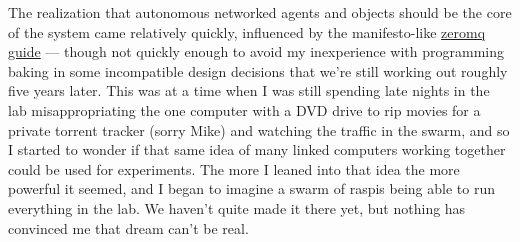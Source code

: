 The realization that autonomous networked agents and objects should be the core of the system came relatively quickly, influenced by the manifesto-like \href{https://zguide.zeromq.org/}{zeromq guide} --- though not quickly enough to avoid my inexperience with programming baking in some incompatible design decisions that we're still working out roughly five years later. This was at a time when I was still spending late nights in the lab misappropriating the one computer with a DVD drive to rip movies for a private torrent tracker (sorry Mike) and watching the traffic in the swarm, and so I started to wonder if that same idea of many linked computers working together could be used for experiments.  The more I leaned into that idea the more powerful it seemed, and I began to imagine a swarm of raspis being able to run everything in the lab. We haven't quite made it there yet, but nothing has convinced me that dream can't be real.